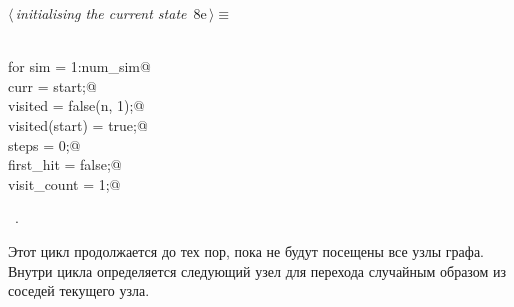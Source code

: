\documentclass{article}
\begin{document}
\begin{flushleft} \small
\begin{minipage}{\linewidth}\label{scrap5}\raggedright\small
{} $\langle\,${\itshape initialising the current state}\nobreak\ {\footnotesize {8e}}$\,\rangle\equiv$
\vspace{-1ex}
\begin{list}{}{} \item
\mbox{}\verb@@\\
\mbox{}\verb@    for sim = 1:num_sim@\\
\mbox{}\verb@        curr = start;@\\
\mbox{}\verb@        visited = false(n, 1);@\\
\mbox{}\verb@        visited(start) = true;@\\
\mbox{}\verb@        steps = 0;@\\
\mbox{}\verb@        first_hit = false;@\\
\mbox{}\verb@        visit_count = 1;@\\
\mbox{}\verb@@{\NWsep}
\end{list}
\vspace{-1.5ex}
\footnotesize
\begin{list}{}{\setlength{\itemsep}{-\parsep}\setlength{\itemindent}{-\leftmargin}}
\item \NWtxtMacroRefIn\ .

\item{}
\end{list}
\end{minipage}\vspace{4ex}
\end{flushleft}
Этот цикл продолжается до тех пор, пока не будут посещены все узлы графа. Внутри цикла определяется следующий узел для перехода случайным образом из соседей текущего узла.
\end{document}
